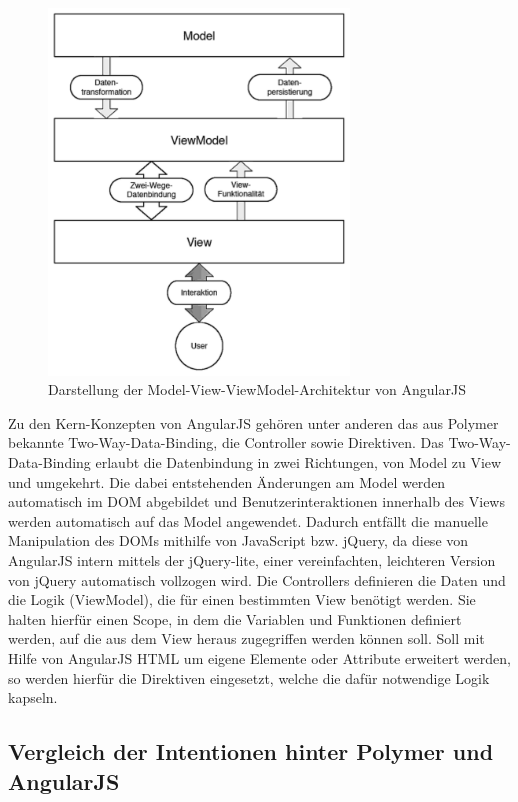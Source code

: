 \begin{figure}[htbp]
 \centering
 \includegraphics[width=8cm]{kapitel7/bilder/1-model-view-viewmodel}
 \caption{Darstellung der Model-View-ViewModel-Architektur von AngularJS}
 \label{fig:ddmvvmavajs}
\end{figure}

Zu den Kern-Konzepten von AngularJS gehören unter anderen das aus Polymer bekannte Two-Way-Data-Binding, die Controller sowie Direktiven. Das Two-Way-Data-Binding erlaubt die Datenbindung in zwei Richtungen, von Model zu View und umgekehrt. Die dabei entstehenden Änderungen am Model werden automatisch im \ac{DOM} abgebildet und Benutzerinteraktionen innerhalb des Views werden automatisch auf das Model angewendet. Dadurch entfällt die manuelle Manipulation des \ac{DOM}s mithilfe von JavaScript bzw. jQuery, da diese von AngularJS intern mittels der jQuery-lite, einer vereinfachten, leichteren Version von jQuery automatisch vollzogen wird. Die Controllers definieren die Daten und die Logik (ViewModel), die für einen bestimmten View benötigt werden. Sie halten hierfür einen Scope, in dem die Variablen und Funktionen definiert werden, auf die aus dem View heraus zugegriffen werden können soll. Soll mit Hilfe von AngularJS \ac{HTML} um eigene Elemente oder Attribute erweitert werden, so werden hierfür die Direktiven eingesetzt, welche die dafür notwendige Logik kapseln.


\subsection{Vergleich der Intentionen hinter Polymer und AngularJS}\label{vergleich-der-intentionen-hinter-polymer-und-angularjs}

